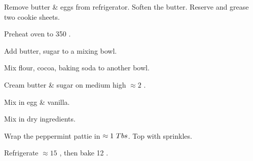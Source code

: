\begin{preparation}
\item Remove butter \& eggs from refrigerator.
    Soften the butter.
    Reserve and grease two cookie sheets.

\item Preheat oven to 350 \Fahrenheit.

\item Add butter, sugar to a mixing bowl.

\item Mix flour, cocoa, baking soda to another bowl.

\item Cream butter \& sugar on medium high $\approx 2$ \minute.

\item Mix in egg \& vanilla.

\item Mix in dry ingredients.

\item Wrap the peppermint pattie in $\approx1~Tbs$.
    Top with sprinkles.

\item Refrigerate $\approx 15$ \minute, then bake 12 \minute.
\end{preparation}

\recipeend%
